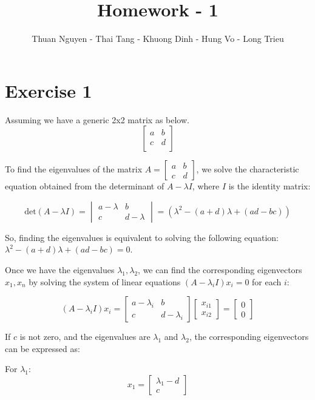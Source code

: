 \documentclass{article}
\title{Homework - 1}
\author{Thuan Nguyen - Thai Tang - Khuong Dinh - Hung Vo - Long Trieu}
\begin{document}
\maketitle

\section*{Exercise 1}
Assuming we have a generic 2x2 matrix as below.
\[
\begin{bmatrix}
    a & b \\
    c & d \\
\end{bmatrix}
\]

To find the eigenvalues of the matrix \( A = \begin{bmatrix} a & b \\ c & d \end{bmatrix} \), we solve the characteristic equation obtained from the determinant of \( A - \lambda I \), where \( I \) is the identity matrix:

\[
\text{det}(A - \lambda I) = \begin{vmatrix} a - \lambda & b \\ c & d - \lambda \end{vmatrix} = (\lambda^2 - (a+d)\lambda + (ad-bc))
\]

So, finding the eigenvalues is equivalent to solving the following equation: \( \lambda^2 - (a+d)\lambda + (ad-bc) = 0 \).

Once we have the eigenvalues \( \lambda_1, \lambda_2 \), we can find the corresponding eigenvectors \( x_1, x_n \) by solving the system of linear equations \( (A - \lambda_i I)x_i = 0 \) for each \( i \):

\[
(A - \lambda_i I)x_i = \begin{bmatrix} a - \lambda_i & b \\ c & d - \lambda_i \end{bmatrix} \begin{bmatrix} x_{i1} \\ x_{i2} \end{bmatrix} = \begin{bmatrix} 0 \\ 0 \end{bmatrix}
\]

If \(c\) is not zero, and the eigenvalues are \(\lambda_1\) and \(\lambda_2\), the corresponding eigenvectors can be expressed as:

For \(\lambda_1\):
\[
x_1 = \begin{bmatrix} \lambda_1 - d \\ c \end{bmatrix}
\]
\end{document}
